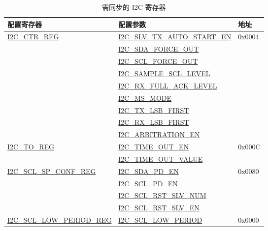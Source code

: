\documentclass[main\_\_CN.tex]{subfiles}
\begin{document}
\begin{longtable}{ | p{6cm} | p{7cm} | p{2cm} | }
\caption{需同步的 I2C 寄存器}\label{tab:i2c-sync-register}\\\hline
\rowcolor{lightgray}
配置寄存器& 配置参数 & 地址  \\ \hline
\hyperref[regdesc:I2CCTRREG]{I2C\_CTR\_REG} & {\hyperref[fielddesc:I2CSLVTXAUTOSTARTEN]{I2C\_SLV\_TX\_AUTO\_START\_EN}} & 0x0004  \\\cline{2-2}


& {\hyperref[fielddesc:I2CSDAFORCEOUT]{I2C\_SDA\_FORCE\_OUT}}& \\\cline{2-2}
& {\hyperref[fielddesc:I2CSCLFORCEOUT]{I2C\_SCL\_FORCE\_OUT}}& \\\cline{2-2}
& {\hyperref[fielddesc:I2CSAMPLESCLLEVEL]{I2C\_SAMPLE\_SCL\_LEVEL}}& \\\cline{2-2}
& {\hyperref[fielddesc:I2CRXFULLACKLEVEL]{I2C\_RX\_FULL\_ACK\_LEVEL}}& \\\cline{2-2}
& {\hyperref[fielddesc:I2CMSMODE]{I2C\_MS\_MODE}}& \\\cline{2-2}
& {\hyperref[fielddesc:I2CTXLSBFIRST]{I2C\_TX\_LSB\_FIRST}}& \\\cline{2-2}
& {\hyperref[fielddesc:I2CRXLSBFIRST]{I2C\_RX\_LSB\_FIRST}}& \\\cline{2-2}
& {\hyperref[fielddesc:I2CARBITRATIONEN]{I2C\_ARBITRATION\_EN}}& \\ \hline

\hyperref[regdesc:I2CTOREG]{I2C\_TO\_REG} & {\hyperref[fielddesc:I2CTIMEOUTEN]{I2C\_TIME\_OUT\_EN}} & 0x000C  \\\cline{2-2}
& {\hyperref[fielddesc:I2CTIMEOUTVALUE]{I2C\_TIME\_OUT\_VALUE}}& \\ \hline




\hyperref[regdesc:I2CSCLSPCONFREG]{I2C\_SCL\_SP\_CONF\_REG} & {\hyperref[fielddesc:I2CSDAPDEN]{I2C\_SDA\_PD\_EN}} & 0x0080  \\\cline{2-2}
& {\hyperref[fielddesc:I2CSCLPDEN]{I2C\_SCL\_PD\_EN}}& \\\cline{2-2}
& {\hyperref[fielddesc:I2CSCLRSTSLVNUM]{I2C\_SCL\_RST\_SLV\_NUM}}& \\\cline{2-2}
& {\hyperref[fielddesc:I2CSCLRSTSLVEN]{I2C\_SCL\_RST\_SLV\_EN}}& \\ \hline

\hyperref[regdesc:I2CSCLLOWPERIODREG]{I2C\_SCL\_LOW\_PERIOD\_REG} & \hyperref[fielddesc:I2CSCLLOWPERIOD]{I2C\_SCL\_LOW\_PERIOD} & 0x0000  \\ \hline


\end{longtable}
\end{document}
